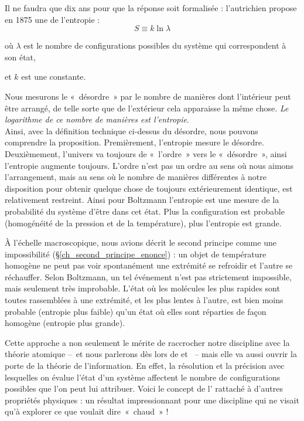 		Il ne faudra que dix ans pour que la réponse soit formalisée : l’autrichien  propose en 1875 une  de l’entropie :
			\begin{equation}
				S \equiv k \ln \lambda
			\end{equation}
			\begin{equationterms}
				\item où \tab $\lambda$ \tab est le nombre de configurations possibles du système qui correspondent à son état,
				\item et \tab $k$ \tab est une constante.
			\end{equationterms}
		
		Nous mesurons le «~dés\-or\-dre~» par le nombre de manières dont l’intérieur peut être arrangé, de telle sorte que de l’extérieur cela apparaisse la même chose. \emph{Le logarithme de ce nombre de manières est l’entropie}.\\
Ainsi, avec la définition technique ci-dessus du désordre, nous pouvons comprendre la proposition. Premièrement, l’entropie mesure le désordre. Deuxièmement, l’univers va toujours de «~l’ordre~» vers le «~désordre~», ainsi l’entropie augmente toujours. L’ordre n’est pas un ordre au sens où nous aimons l’arrangement, mais au sens où le nombre de manières différentes à notre disposition pour obtenir quelque chose de toujours extérieurement identique, est relativement restreint.
		Ainsi pour Boltzmann l’entropie est une mesure de la probabilité du système d’être dans cet état. Plus la configuration est probable (homogénéité de la pression et de la température), plus l’entropie est grande.
		
		À l’échelle macroscopique, nous avions décrit le second principe comme une impossibilité (\S\ref{ch_second_principe_enonce}) : un objet de température homogène ne peut pas voir spontanément une extrémité se refroidir et l’autre se réchauffer. Selon Boltzmann, un tel événement n’est pas strictement impossible, mais seulement très improbable. L’état où les molécules les plus rapides sont toutes rassemblées à une extrémité, et les plus lentes à l’autre, est bien moins probable (entropie plus faible) qu’un état où elles sont réparties de façon homogène (entropie plus grande).
		
		Cette approche a non seulement le mérite de raccrocher notre discipline avec la théorie atomique --\ et nous parlerons dès lors de  et \ -- mais elle va aussi ouvrir la porte de la théorie de l’information. En effet, la résolution et la précision avec lesquelles on évalue l’état d’un système affectent le nombre de configurations possibles que l’on peut lui attribuer. Voici le concept de l’ rattaché à d’autres propriétés physiques : un résultat impressionnant pour une discipline qui ne visait qu’à explorer ce que voulait dire~«~chaud~» !
		
